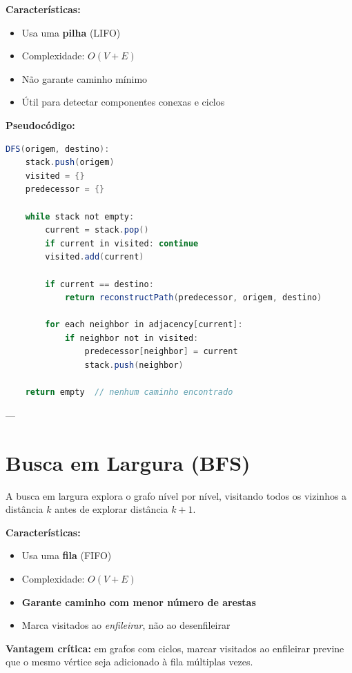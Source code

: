 \documentclass[12pt,openright,twoside,a4paper,english,brazilian,hidelinks]{abntex2}
\begin{document}
    \textbf{Características:}
    \begin{itemize}
        \item Usa uma \textbf{pilha} (LIFO)
        \item Complexidade: $O(V + E)$
        \item Não garante caminho mínimo
        \item Útil para detectar componentes conexas e ciclos
    \end{itemize}

    \textbf{Pseudocódigo:}

    \begin{lstlisting}[language=Java]
DFS(origem, destino):
    stack.push(origem)
    visited = {}
    predecessor = {}

    while stack not empty:
        current = stack.pop()
        if current in visited: continue
        visited.add(current)

        if current == destino:
            return reconstructPath(predecessor, origem, destino)

        for each neighbor in adjacency[current]:
            if neighbor not in visited:
                predecessor[neighbor] = current
                stack.push(neighbor)

    return empty  // nenhum caminho encontrado
    \end{lstlisting}

    ---

    \section{Busca em Largura (BFS)}

    A busca em largura explora o grafo nível por nível, visitando todos os vizinhos a
    distância $k$ antes de explorar distância $k+1$.

    \textbf{Características:}
    \begin{itemize}
        \item Usa uma \textbf{fila} (FIFO)
        \item Complexidade: $O(V + E)$
        \item \textbf{Garante caminho com menor número de arestas}
        \item Marca visitados ao \textit{enfileirar}, não ao desenfileirar
    \end{itemize}

    \textbf{Vantagem crítica:} em grafos com ciclos, marcar visitados ao enfileirar previne
    que o mesmo vértice seja adicionado à fila múltiplas vezes.
\end{document}
